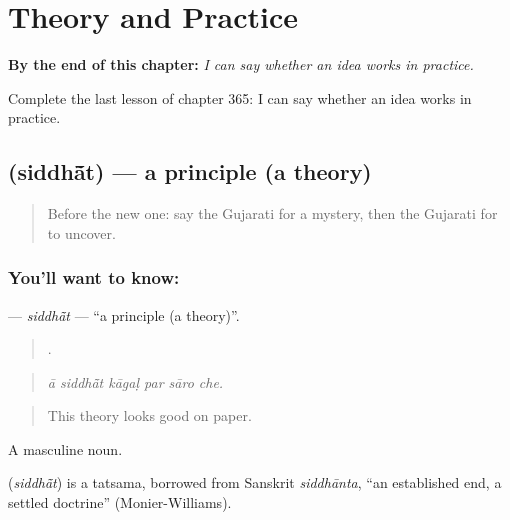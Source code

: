 
\chapter{Theory and Practice}
\label{ch:gu-theory-and-practice}

\begin{chapteropening}
\textbf{By the end of this chapter:} \emph{I can say whether an idea works in practice.}

Complete the last lesson of chapter 365: I can say whether an idea works in practice.
\end{chapteropening}

\section[\texorpdfstring{\gu{સિદ્ધાંત} (siddhā̃t)}{સિદ્ધાંત (siddhā̃t)}]{ (siddhā̃t) — a principle (a theory)}

\label{lesson:GU-C365-siddhat}



\begin{quote}
Before the new one: say the Gujarati for a mystery, then the Gujarati for to uncover.
\end{quote}

\subsection*{You'll want to know: }
\textbf{} — \emph{siddhā̃t} — \textquotedblleft{}a principle (a theory)\textquotedblright{}.

\begin{quote}
     .
\end{quote}

\begin{quote}
\emph{ā siddhā̃t kāgaḷ par sāro che.}
\end{quote}

\begin{quote}
This theory looks good on paper.
\end{quote}

A masculine noun.

\begin{cousinweb}
\textbf{} (\emph{siddhā̃t}) is a tatsama, borrowed from Sanskrit \emph{siddhānta}, \textquotedblleft{}an established end, a settled doctrine\textquotedblright{} (Monier-Williams).
\end{cousinweb}

